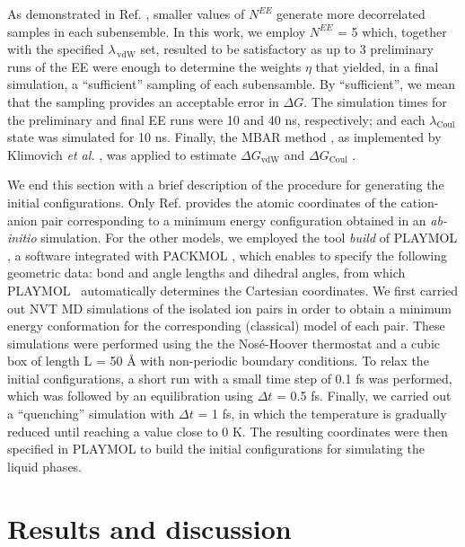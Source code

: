 \documentclass[3p,twocolumn]{elsarticle}
\begin{document}
As demonstrated in Ref. , smaller values of $N^{EE}$ generate more decorrelated samples in each subensemble. In this work, we employ $N^{EE}$ = 5 which, together with the specified $\lambda_{\, \text{vdW}}$ set, resulted to be satisfactory as up to 3 preliminary runs of the EE were enough to determine the weights $\eta$ that yielded, in a final simulation, a ``sufficient'' sampling of each subensamble. By ``sufficient'', we mean that the sampling provides an acceptable error in $\Delta G$. The simulation times for the preliminary and final EE runs were 10 and 40 ns, respectively; and each $\lambda_{\text{Coul}}$ state was simulated for 10 ns. Finally, the MBAR method \cite{Shirts_2008}, as implemented by Klimovich \textit{et al.} \cite{Klimovich_2015}, was applied to estimate $\Delta G_{\text{vdW}}$ and $\Delta G_{\text{Coul}}$ .

We end this section with a brief description of the procedure for generating the initial configurations. Only Ref.  provides the atomic coordinates of the cation-anion pair corresponding to a minimum energy configuration obtained in an \textit{ab-initio} simulation. For the other models, we employed the tool \textit{build} of PLAYMOL \cite{playmol}, a software integrated with PACKMOL \cite{Mart_nez_2009}, which enables to specify the following geometric data: bond and angle lengths and dihedral angles, from which PLAYMOL~\cite{playmol} automatically determines the Cartesian coordinates. We first carried out NVT MD simulations of the isolated ion pairs in order to obtain a minimum energy conformation for the corresponding (classical) model of each pair. These simulations were performed using the the Nos\'{e}-Hoover thermostat \cite{Martyna1992} and a cubic box of length L = 50 {\AA} with non-periodic boundary conditions. To relax the initial configurations, a short run with a small time step of 0.1 fs was performed, which was followed by an equilibration using $\Delta t$ = 0.5 fs. Finally, we carried out a ``quenching'' simulation with $\Delta t$ = 1 fs, in which the temperature is gradually reduced until reaching a value close to 0 K. The resulting coordinates were then specified in PLAYMOL \cite{playmol} to build the initial configurations for simulating the liquid phases.

\section{Results and discussion}
\label{sec:results}
\end{document}
